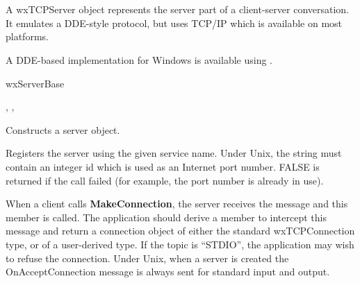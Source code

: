 \section{}\label{wxtcpserver}

A wxTCPServer object represents the server part of a client-server conversation.
It emulates a DDE-style protocol, but uses TCP/IP which is available on most platforms.

A DDE-based implementation for Windows is available using .


wxServerBase\\


, , 




Constructs a server object.



Registers the server using the given service name. Under Unix, the
string must contain an integer id which is used as an Internet port
number. FALSE is returned if the call failed (for example, the port
number is already in use).

\label{wxtcpserveronacceptconnection}


When a client calls {\bf MakeConnection}, the server receives the
message and this member is called. The application should derive a
member to intercept this message and return a connection object of
either the standard wxTCPConnection type, or of a user-derived type. If the
topic is ``STDIO'', the application may wish to refuse the connection.
Under Unix, when a server is created the OnAcceptConnection message is
always sent for standard input and output.

